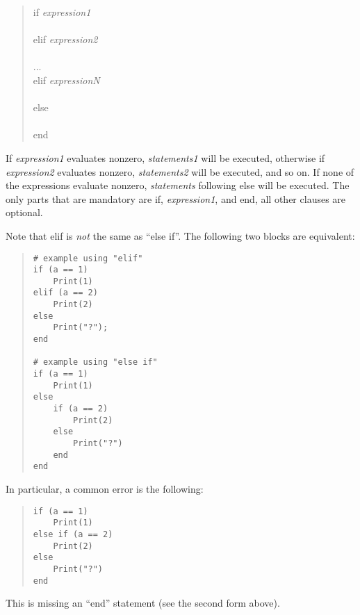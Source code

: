 \begin{quote}
{\vt if} {\it expression1}\\
\hspace*{2em}{\it statements1}\\
{\vt elif} {\it expression2}\\
\hspace*{2em}{\it statements2}\\
...\\
{\vt elif} {\it expressionN}\\
\hspace*{2em}{\it statementsN}\\
{\vt else}\\
\hspace*{2em}{\it statements}\\
{\vt end}
\end{quote}

If {\it expression1\/} evaluates nonzero, {\it statements1\/} will be
executed, otherwise if {\it expression2} evaluates nonzero, {\it
statements2} will be executed, and so on.  If none of the expressions
evaluate nonzero, {\it statements} following {\vt else} will be
executed.  The only parts that are mandatory are {\vt if}, {\it
expression1}, and {\vt end}, all other clauses are optional.

Note that {\vt elif} is {\it not} the same as ``{\vt else if}''.  The
following two blocks are equivalent:

\begin{quote}
\begin{verbatim}
# example using "elif"
if (a == 1)
    Print(1)
elif (a == 2)
    Print(2)
else
    Print("?");
end

# example using "else if"
if (a == 1)
    Print(1)
else
    if (a == 2)
        Print(2)
    else
        Print("?")
    end
end
\end{verbatim}
\end{quote}

In particular, a common error is the following:

\begin{quote}
\begin{verbatim}
if (a == 1)
    Print(1)
else if (a == 2)
    Print(2)
else
    Print("?")
end
\end{verbatim}
\end{quote}

This is missing an ``{\vt end}'' statement (see the second form
above).

